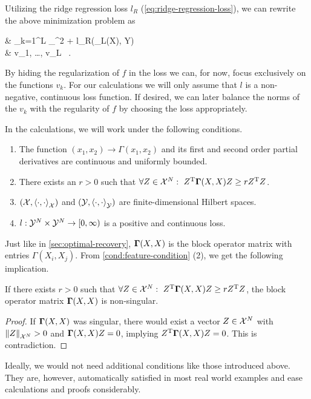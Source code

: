 Utilizing the ridge regression loss $l_R$ (\cref{eq:ridge-regression-loss}), we can rewrite the above minimization problem as
\begin{problem}
	\label{prob:discrete-resnet}
	\begin{cases}
		 & \nu \cdot {} \sum_{k=1}^{L} _\cV^2
		+ l_R(\Phi_L(X), Y) \\
		 & v_1, \ldots, v_L \in \cV\ .
	\end{cases}
\end{problem}
By hiding the regularization of $f$ in the loss we can, for now, focus exclusively on the functions $v_k$.
For our calculations we will only assume that $l$ is a non-negative, continuous loss function.
If desired, we can later balance the norms of the $v_k$ with the regularity of $f$ by choosing the loss appropriately.

In the calculations, we will work under the following conditions.
\begin{condition}
	\label{cond:feature-condition}\mbox{}
	\vspace*{-\parsep}
	\vspace*{-\baselineskip}
	\begin{enumerate}
		\item The function $(x_1, x_2) \rightarrow \Gamma(x_1, x_2)$ and its first and second order partial derivatives are continuous and uniformly bounded.
		\item There exists an $r > 0$ such that $\forall Z \in \mathcal{X}^N:~Z^{\mathrm{T}} \mathbf{\Gamma}(X, X) Z \geq r Z^{\mathrm{T}} Z$.
		\item $(\mathcal{X}, \left< \cdot, \cdot \right >_{\mathcal{X}})$ and $(\mathcal{Y}, \left< \cdot, \cdot\right >_{\mathcal{Y}})$ are finite-dimensional Hilbert spaces.
		\item $l: \mathcal{Y}^N \times \mathcal{Y}^N \rightarrow [0, \infty)$ is a positive and continuous loss.
	\end{enumerate}
\end{condition}
Just like in \cref{sec:optimal-recovery}, $\mathbf{\Gamma}(X, X)$ is the block operator matrix with entries $\Gamma(X_i, X_j)$.
From \cref{cond:feature-condition} (2), we get the following implication.
\begin{lemma}
	If there exists $r > 0$ such that $\forall Z \in \mathcal{X}^N:~Z^{\mathrm{T}} \mathbf{\Gamma}(X, X) Z \geq r Z^{\mathrm{T}} Z$, the block operator matrix $\mathbf{\Gamma}(X, X)$ is non-singular.
\end{lemma}
\begin{proof}
	If $\mathbf{\Gamma}(X, X)$ was singular, there would exist a vector $Z \in \mathcal{X}^N$ with $\norm{Z}_{\mathcal{X}^N} > 0$ and $\mathbf{\Gamma}(X, X) Z = 0$, implying $Z^{\mathrm{T}} \mathbf{\Gamma}(X, X)Z = 0$. 
	This is contradiction.
\end{proof}
Ideally, we would not need additional conditions like those introduced above.
They are, however, automatically satisfied in most real world examples and ease calculations and proofs considerably.

